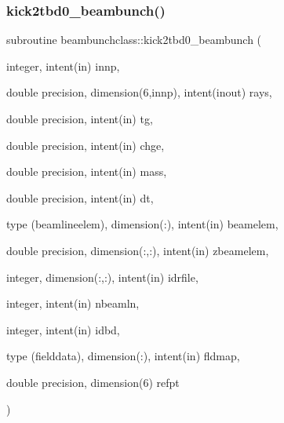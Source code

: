 \subsubsection{\texorpdfstring{kick2tbd0\_beambunch()}{kick2tbd0\_beambunch()}}
{\footnotesize\ttfamily subroutine beambunchclass\+::kick2tbd0\+\_\+beambunch (\begin{DoxyParamCaption}\item[{integer, intent(in)}]{innp,  }\item[{double precision, dimension(6,innp), intent(inout)}]{rays,  }\item[{double precision, intent(in)}]{tg,  }\item[{double precision, intent(in)}]{chge,  }\item[{double precision, intent(in)}]{mass,  }\item[{double precision, intent(in)}]{dt,  }\item[{type (beamlineelem), dimension(\+:), intent(in)}]{beamelem,  }\item[{double precision, dimension(\+:,\+:), intent(in)}]{zbeamelem,  }\item[{integer, dimension(\+:,\+:), intent(in)}]{idrfile,  }\item[{integer, intent(in)}]{nbeamln,  }\item[{integer, intent(in)}]{idbd,  }\item[{type (fielddata), dimension(\+:), intent(in)}]{fldmap,  }\item[{double precision, dimension(6)}]{refpt }\end{DoxyParamCaption})}

